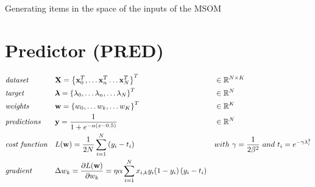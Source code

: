 \documentclass[a4paper]{article}
\begin{document}
\IncMargin{1em}
\begin{algorithm}[H]
\DontPrintSemicolon
{}




\BlankLine

\BlankLine

\caption{Generating items in the space of the inputs of the MSOM}\label{generate}
\end{algorithm}
\DecMargin{1em}

\pagebreak
\section*{Predictor (PRED)}
\begin{align}
	& \emph{dataset} &&
    \mathbf{X} = \left\{\mathbf{x}^T_0, 
    \dots\mathbf{x}^T_n \dots\mathbf{x}^T_N\right\}^T &&
    \in \mathbb{R}^{N\times K} \nonumber\\
    & \emph{target} && 
    \boldsymbol{\lambda} = \left\{\lambda_0, \dots\lambda_n, \dots 
    \lambda_N\right\}^T&&\in\mathbb{R}^N \nonumber \\
    & \emph{weights} && 
    \mathbf{w} = \left\{w_0, \dots w_k, \dots w_K\right\}^T && 
    \in \mathbb{R}^K\nonumber\\
	& \emph{predictions} && 
    \mathbf{y} = \frac{1}{1 + e^{-\alpha(x-0.5)}} &&
    \in \mathbb{R}^{N} \nonumber\\
    & \emph{cost function} && 
    L(\mathbf{w}) = \frac{1}{2N}\sum_{i=1}^N 
    {\left(y_i - t_i\right)} && 
    with\ \gamma = \frac{1}{2\beta^2}\ and\ t_i = 
    e^{-\gamma\lambda_i^2}\nonumber\\
    & \emph{gradient} && 
    \Delta w_k = \frac{\partial{L(\mathbf{w})}}
    {\partial{w_k}} = \eta\alpha
    \sum_{i=1}^N x_{i, k} y_i(1-y_i)
    \left(y_i - t_i\right) \nonumber
\end{align}
\end{document}
